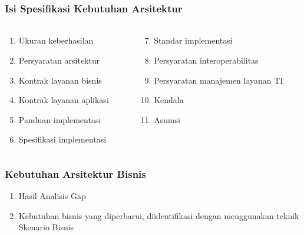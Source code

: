 \documentclass[aspectratio=169, table]{beamer}
\begin{document}
	\begin{frame}
		\frametitle{Isi Spesifikasi Kebutuhan Arsitektur}
		\framesubtitle{\hspace{1cm}}
		\begin{columns}
			\begin{column}{0.5\textwidth}
				\begin{center}
					\begin{enumerate}
						\item Ukuran keberhasilan
						\item Persyaratan arsitektur
						\item Kontrak layanan bisnis
						\item Kontrak layanan aplikasi
						\item Panduan implementasi
						\item Spesifikasi implementasi

					\end{enumerate}
				\end{center}
			\end{column}
			\begin{column}{0.5\textwidth}
				\begin{center}
					\begin{enumerate}
						\setcounter{enumi}{6}
						\item Standar implementasi
						\item Persyaratan interoperabilitas
						\item Persyaratan manajemen layanan TI
						\item Kendala
						\item Asumsi
					\end{enumerate}
				\end{center}
			\end{column}
		\end{columns}
	\end{frame}

	\begin{frame}
		\frametitle{Kebutuhan Arsitektur Bisnis}
		\begin{enumerate}
			\item Hasil Analisis Gap
			\item Kebutuhan bisnis yang diperbarui, diidentifikasi dengan menggunakan teknik Skenario Bisnis
		\end{enumerate}
	\end{frame}
\end{document}
